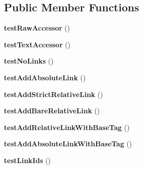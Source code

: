 \subsection*{Public Member Functions}
\begin{DoxyCompactItemize}
\item 
\hypertarget{class_test_of_html_page_a7ed7db8c70a6be25119cfb8c0bf0a01d}{
{\bfseries testRawAccessor} ()}
\label{class_test_of_html_page_a7ed7db8c70a6be25119cfb8c0bf0a01d}

\item 
\hypertarget{class_test_of_html_page_a80ee58509047653022863480f12e7c55}{
{\bfseries testTextAccessor} ()}
\label{class_test_of_html_page_a80ee58509047653022863480f12e7c55}

\item 
\hypertarget{class_test_of_html_page_a9ec9b1db320fb644459e40d40855000b}{
{\bfseries testNoLinks} ()}
\label{class_test_of_html_page_a9ec9b1db320fb644459e40d40855000b}

\item 
\hypertarget{class_test_of_html_page_a1a5d7d7c3ad3cf31756d5afaeccb51b4}{
{\bfseries testAddAbsoluteLink} ()}
\label{class_test_of_html_page_a1a5d7d7c3ad3cf31756d5afaeccb51b4}

\item 
\hypertarget{class_test_of_html_page_ab226d19c1643b1e83b69233ad53118ee}{
{\bfseries testAddStrictRelativeLink} ()}
\label{class_test_of_html_page_ab226d19c1643b1e83b69233ad53118ee}

\item 
\hypertarget{class_test_of_html_page_a3bb304b8d08b2b599d0f11c19bb42e4d}{
{\bfseries testAddBareRelativeLink} ()}
\label{class_test_of_html_page_a3bb304b8d08b2b599d0f11c19bb42e4d}

\item 
\hypertarget{class_test_of_html_page_a993f8b6cb52ecbaeb8b10cce0f570988}{
{\bfseries testAddRelativeLinkWithBaseTag} ()}
\label{class_test_of_html_page_a993f8b6cb52ecbaeb8b10cce0f570988}

\item 
\hypertarget{class_test_of_html_page_a35752512e199d4f2b240e96cb00823b7}{
{\bfseries testAddAbsoluteLinkWithBaseTag} ()}
\label{class_test_of_html_page_a35752512e199d4f2b240e96cb00823b7}

\item 
\hypertarget{class_test_of_html_page_aa9ccf3e96ade9aed0580190cc41f194f}{
{\bfseries testLinkIds} ()}
\label{class_test_of_html_page_aa9ccf3e96ade9aed0580190cc41f194f}


\end{DoxyCompactItemize}
